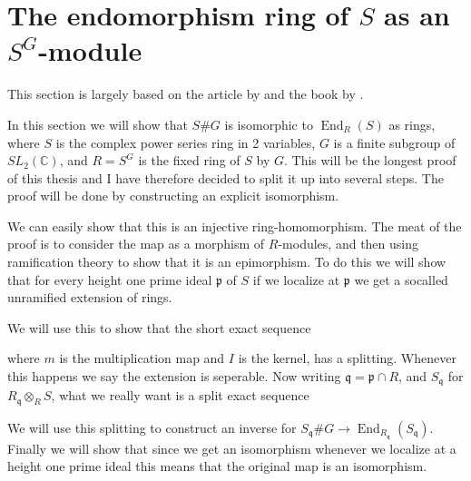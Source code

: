 \documentclass[11pt, a4paper, english]{article}
\numberwithin{prop}{section}
\numberwithin{lemma}{section}
\numberwithin{theorem}{section}
\numberwithin{defin}{section}
\numberwithin{example}{section}
\newcommand{\C}{\mathbb{C}}
\DeclareMathOperator{\End}{End}
\begin{document}
\section{The endomorphism ring of $S$ as an $S^G$-module}
This section is largely based on the article by \cite{IyTa} and the book by \cite{CMR}.

In this section we will show that $S\#G$ is isomorphic to $\End_R(S)$ as rings, where $S$ is the complex power series ring in 2 variables, $G$ is a finite subgroup of $SL_2(\C)$, and $R = S^G$ is the fixed ring of $S$ by $G$. This will be the longest proof of this thesis and I have therefore decided to split it up into several steps. The proof will be done by constructing an explicit isomorphism.
\begin{center}
\end{center}
We can easily show that this is an injective ring-homomorphism. The meat of the proof is to consider the map as a morphism of $R$-modules, and then using ramification theory to show that it is an epimorphism. To do this we will show that for every height one prime ideal $\mathfrak{p}$ of $S$ if we localize at $\mathfrak{p}$ we get a socalled unramified extension of rings.
\begin{center}
\end{center}
We will use this to show that the short exact sequence
\begin{center}
\end{center}
where $m$ is the multiplication map and $I$ is the kernel, has a splitting. Whenever this happens we say the extension is seperable. Now writing $\mathfrak{q} = \mathfrak{p} \cap R$, and $S_\mathfrak{q}$ for $R_\mathfrak{q} \otimes_R S$, what we really want is a split exact sequence
\begin{center}
\end{center}
We will use this splitting to construct an inverse for $S_\mathfrak{q}\#G \to \End_{R_{\mathfrak{q}}}(S_\mathfrak{q})$. Finally we will show that since we get an isomorphism whenever we localize at a height one prime ideal this means that the original map is an isomorphism.
\end{document}
